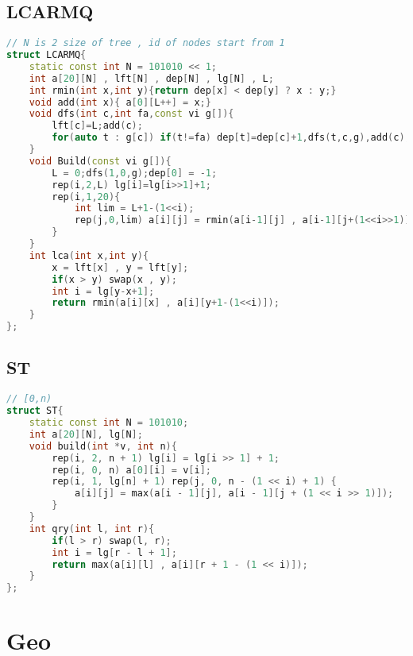 \subsection{LCARMQ}
\begin{lstlisting}[language=C++]
// N is 2 size of tree , id of nodes start from 1
struct LCARMQ{
	static const int N = 101010 << 1;
	int a[20][N] , lft[N] , dep[N] , lg[N] , L;
	int rmin(int x,int y){return dep[x] < dep[y] ? x : y;}
	void add(int x){ a[0][L++] = x;}
	void dfs(int c,int fa,const vi g[]){
		lft[c]=L;add(c);
		for(auto t : g[c]) if(t!=fa) dep[t]=dep[c]+1,dfs(t,c,g),add(c);
	}
	void Build(const vi g[]){
		L = 0;dfs(1,0,g);dep[0] = -1;
		rep(i,2,L) lg[i]=lg[i>>1]+1;
		rep(i,1,20){
			int lim = L+1-(1<<i);
			rep(j,0,lim) a[i][j] = rmin(a[i-1][j] , a[i-1][j+(1<<i>>1)]);
		}
	}
	int lca(int x,int y){
		x = lft[x] , y = lft[y];
		if(x > y) swap(x , y);
		int i = lg[y-x+1];
		return rmin(a[i][x] , a[i][y+1-(1<<i)]);
	}
};
\end{lstlisting}
\subsection{ST}
\begin{lstlisting}[language=C++]
// [0,n)
struct ST{
	static const int N = 101010;
	int a[20][N], lg[N];
	void build(int *v, int n){
		rep(i, 2, n + 1) lg[i] = lg[i >> 1] + 1;
		rep(i, 0, n) a[0][i] = v[i];
		rep(i, 1, lg[n] + 1) rep(j, 0, n - (1 << i) + 1) {
			a[i][j] = max(a[i - 1][j], a[i - 1][j + (1 << i >> 1)]);
		}
	}
	int qry(int l, int r){
		if(l > r) swap(l, r);
		int i = lg[r - l + 1];
		return max(a[i][l] , a[i][r + 1 - (1 << i)]);
	}
};
\end{lstlisting}

\section{Geo}
